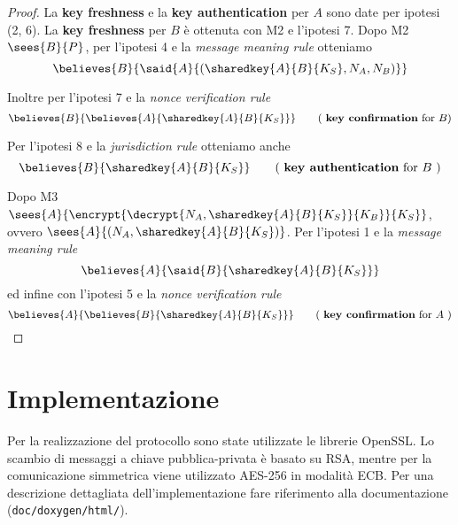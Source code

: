 \documentclass[a4paper]{article}
\begin{document}
\begin{proof}
La {\bf key freshness} e la {\bf key authentication} per $A$ sono date per ipotesi (2, 6).
La {\bf key freshness} per $B$ è ottenuta con M2 e l'ipotesi 7.
Dopo M2 $\sees{B}{P}$, per l'ipotesi 4 e la {\em message meaning rule} otteniamo
\[
\believes{B}{ \said{A}{( \sharedkey{A}{B}{K_S}, N_A, N_B )} }
\]

Inoltre per l'ipotesi 7 e la {\em nonce verification rule}
\[
\believes{B}{ \believes{A}{ \sharedkey{A}{B}{K_S} } }   \tag{ {\bf key confirmation} for $B$}
\]

Per l'ipotesi 8 e la {\em jurisdiction rule} otteniamo anche
\[
\believes{B}{ \sharedkey{A}{B}{K_S} } \tag{ {\bf key authentication} for $B$ }
\]

Dopo M3 $\sees{A}{ \encrypt{ \decrypt{N_A,\sharedkey{A}{B}{K_S}}{K_B} }{K_S} }$, ovvero $\sees{A}{ (N_A,\sharedkey{A}{B}{K_S}) }$. Per l'ipotesi 1 e la {\em message meaning rule}
\[
\believes{A}{ \said{B}{ \sharedkey{A}{B}{K_S} } }
\]
ed infine con l'ipotesi 5 e la {\em nonce verification rule}
\[
\believes{A}{ \believes{B}{ \sharedkey{A}{B}{K_S} } } \tag{ {\bf key confirmation} for $A$ }
\]
\end{proof}


\section{Implementazione}
Per la realizzazione del protocollo sono state utilizzate le librerie OpenSSL. Lo scambio di messaggi a chiave pubblica-privata è basato su RSA, mentre per la comunicazione simmetrica viene utilizzato AES-256 in modalità ECB. Per una descrizione dettagliata dell'implementazione fare riferimento alla documentazione ({\tt doc/doxygen/html/}).
\end{document}
